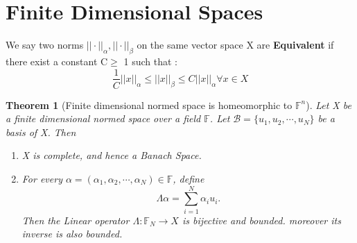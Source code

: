 \documentclass{article}
\newtheorem{theorem}{Theorem}[section]
\begin{document}
\section{Finite Dimensional Spaces}
We say two norms $||\cdot||_{\alpha }, ||\cdot||_{\beta}$ on the same vector space X  are \textbf{Equivalent} if there exist a constant C$\geq$ 1 such that :$$\frac{1}{C} ||x||_{\alpha}\leq ||x||_{\beta} \leq C ||x||_{\alpha}  \forall x \in X$$

\begin{theorem}[Finite dimensional normed space is homeomorphic to $\mathbb{F}^n $]
    Let X be a finite dimensional normed space over a field $ \mathbb{F} $. Let $\mathcal{B} = \{u_1,u_2, \cdots,u_N \} $ be a basis of X. Then 
    \begin{enumerate}
        \item X is complete, and hence a Banach Space.
        \item For every $\alpha = (\alpha_1,\alpha_2,\cdots, \alpha_N) \in \mathbb{F} $, define \begin{equation}
            \Lambda \alpha = \sum_{i=1}^{N} \alpha_i u_i.
        \end{equation}
        Then the Linear operator $\Lambda: \mathbb{F}_N \rightarrow X $ is bijective and bounded. moreover its inverse is also bounded. 

    \end{enumerate}
    
\end{theorem}
\end{document}
